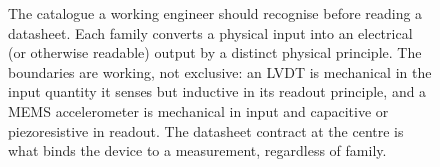 \begin{figure}[ht]
\begin{tikzpicture}
\end{tikzpicture}
\caption[The six transducer families and their working examples]{The
catalogue a working engineer should recognise before reading a
datasheet. Each family converts a physical input into an electrical
(or otherwise readable) output by a distinct physical principle.
The boundaries are working, not exclusive: an LVDT is mechanical
in the input quantity it senses but inductive in its readout
principle, and a MEMS accelerometer is mechanical in input and
capacitive or piezoresistive in readout. The datasheet contract at
the centre is what binds the device to a measurement, regardless of
family.}
\label{fig:vol01:ch05:transducer-families}
\end{figure}
